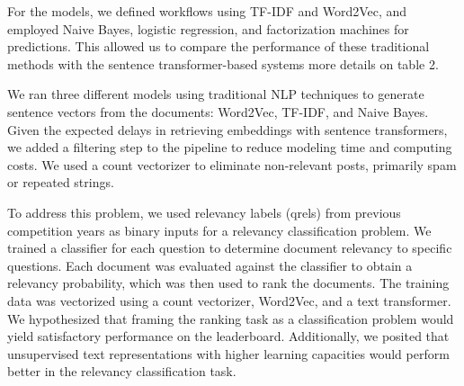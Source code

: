 \documentclass[]{style/ceurart}
\begin{document}
For the models, we defined workflows using TF-IDF and Word2Vec, and employed Naive Bayes, logistic regression, and factorization machines for predictions. This allowed us to compare the performance of these traditional methods with the sentence transformer-based systems more details on table 2.

We ran three different models using traditional NLP techniques to generate sentence vectors from the documents: Word2Vec, TF-IDF, and Naive Bayes. Given the expected delays in retrieving embeddings with sentence transformers, we added a filtering step to the pipeline to reduce modeling time and computing costs. We used a count vectorizer to eliminate non-relevant posts, primarily spam or repeated strings.

To address this problem, we used relevancy labels (qrels) from previous competition years as binary inputs for a relevancy classification problem. We trained a classifier for each question to determine document relevancy to specific questions. Each document was evaluated against the classifier to obtain a relevancy probability, which was then used to rank the documents. The training data was vectorized using a count vectorizer, Word2Vec, and a text transformer. We hypothesized that framing the ranking task as a classification problem would yield satisfactory performance on the leaderboard. Additionally, we posited that unsupervised text representations with higher learning capacities would perform better in the relevancy classification task.

\end{document}
